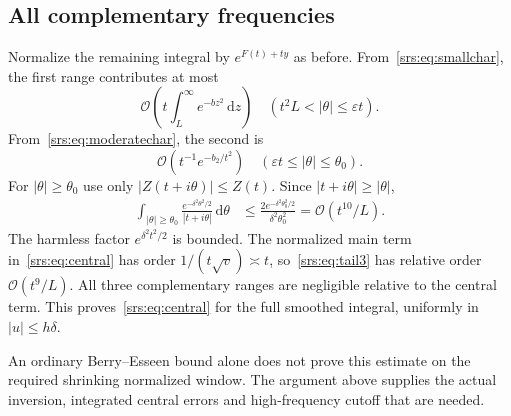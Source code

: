 \documentclass[11pt]{article}
\numberwithin{equation}{section}
\theoremstyle{remark}\newtheorem{remark}[theorem]{Remark}
\newcommand{\Oh}{\mathcal O}
\newcommand{\dd}{\,\mathrm d}
\begin{document}
\subsection{All complementary frequencies}
Normalize the remaining integral by $e^{F(t)+ty}$ as before. From~\eqref{srs:eq:smallchar}, the first range contributes at most
\begin{equation}
 \Oh\left(t\int_L^\infty e^{-b z^2}\dd z\right)
 \quad(t^2L<|\theta|\le\varepsilon t).\label{srs:eq:tail1}
\end{equation}
From~\eqref{srs:eq:moderatechar}, the second is
\begin{equation}
 \Oh(t^{-1}e^{-b_2/t^2})
 \quad(\varepsilon t\le|\theta|\le\theta_0).\label{srs:eq:tail2}
\end{equation}
For $|\theta|\ge\theta_0$ use only $|Z(t+i\theta)|\le Z(t)$. Since
$|t+i\theta|\ge|\theta|$,
\begin{align}
 \int_{|\theta|\ge\theta_0}
 \frac{e^{-\delta^2\theta^2/2}}{|t+i\theta|}\dd\theta
 &\le \frac{2e^{-\delta^2\theta_0^2/2}}{\delta^2\theta_0^2}
 =\Oh(t^{10}/L).\label{srs:eq:tail3}
\end{align}
The harmless factor $e^{\delta^2t^2/2}$ is bounded. The normalized main term in~\eqref{srs:eq:central} has order $1/(t\sqrt v)\asymp t$, so~\eqref{srs:eq:tail3} has relative order $\Oh(t^9/L)$. All three complementary ranges are negligible relative to the central term. This proves~\eqref{srs:eq:central} for the full smoothed integral, uniformly in $|u|\le h\delta$.

An ordinary Berry--Esseen bound alone does not prove this estimate on the required shrinking normalized window. The argument above supplies the actual inversion, integrated central errors and high-frequency cutoff that are needed.
\end{document}
